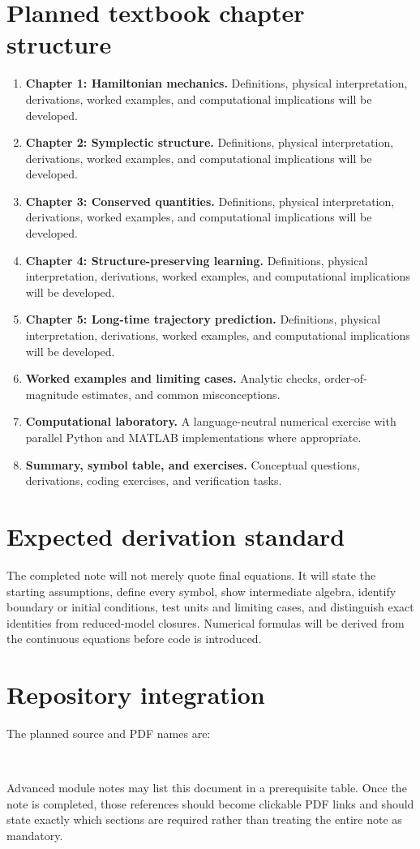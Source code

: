 \documentclass[11pt]{article}
\begin{document}
\section{Planned textbook chapter structure}
\begin{enumerate}[leftmargin=1.8em]
\item \textbf{Chapter 1: Hamiltonian mechanics.} Definitions, physical interpretation, derivations, worked examples, and computational implications will be developed.
\item \textbf{Chapter 2: Symplectic structure.} Definitions, physical interpretation, derivations, worked examples, and computational implications will be developed.
\item \textbf{Chapter 3: Conserved quantities.} Definitions, physical interpretation, derivations, worked examples, and computational implications will be developed.
\item \textbf{Chapter 4: Structure-preserving learning.} Definitions, physical interpretation, derivations, worked examples, and computational implications will be developed.
\item \textbf{Chapter 5: Long-time trajectory prediction.} Definitions, physical interpretation, derivations, worked examples, and computational implications will be developed.
\item \textbf{Worked examples and limiting cases.} Analytic checks, order-of-magnitude estimates, and common misconceptions.
\item \textbf{Computational laboratory.} A language-neutral numerical exercise with parallel Python and MATLAB implementations where appropriate.
\item \textbf{Summary, symbol table, and exercises.} Conceptual questions, derivations, coding exercises, and verification tasks.
\end{enumerate}

\section{Expected derivation standard}
The completed note will not merely quote final equations. It will state the starting assumptions, define every symbol, show intermediate algebra, identify boundary or initial conditions, test units and limiting cases, and distinguish exact identities from reduced-model closures. Numerical formulas will be derived from the continuous equations before code is introduced.

\section{Repository integration}
The planned source and PDF names are:
\begin{center}
\\
\end{center}
Advanced module notes may list this document in a prerequisite table. Once the note is completed, those references should become clickable PDF links and should state exactly which sections are required rather than treating the entire note as mandatory.
\end{document}
